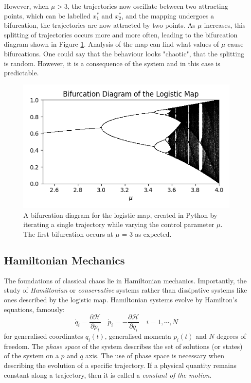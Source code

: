 \documentclass[12pt,a4paper]{amsart}
\begin{document}

However, when $\mu > 3$, the trajectories now oscillate between two attracting points, which can be labelled $x_{1}^{*}$ and $x_{2}^{*}$, and the mapping undergoes a bifurcation, the trajectories are now attracted by two points. As $\mu$ increases, this splitting of trajectories occurs more and more often, leading to the bifurcation diagram shown in Figure \ref{fig:bif}. Analysis of the map can find what values of $\mu$ cause bifurcations. One could say that the behaviour looks "chaotic", that the splitting is random. However, it is a consequence of the system and in this case is predictable.

\begin{figure}[h] 
    \centering
    \includegraphics[scale=0.8]{logistic_map_bifur.png}
    \caption{A bifurcation diagram for the logistic map, created in Python by iterating a single trajectory while varying the control parameter $\mu$. The first bifurcation occurs at $\mu$ = 3 as expected.}
    \label{fig:bif}
\end{figure}

\newpage

\subsection{Hamiltonian Mechanics}

The foundations of classical chaos lie in Hamiltonian mechanics. Importantly, the study of \textit{Hamiltonian} or \textit{conservative} systems rather than dissipative systems like ones described by the logistic map. Hamiltonian systems evolve by Hamilton's equations, famously:
$$\dot{q}_{i} = \frac{\partial \mathcal{H}}{\partial p_{i}} \quad \dot{p}_{i} = -\frac{\partial \mathcal{H}}{\partial q_{i}} \quad i = 1, \cdots , N$$
for generalised coordinates $q_{i}(t)$, generalised momenta $p_{i}(t)$ and $N$ degrees of freedom. The \textit{phase space} of the system describes the set of solutions (or states) of the system on a $p$ and $q$ axis. The use of phase space is necessary when describing the evolution of a specific trajectory. If a physical quantity remains constant along a trajectory, then it is called a \textit{constant of the motion}. 
\end{document}
